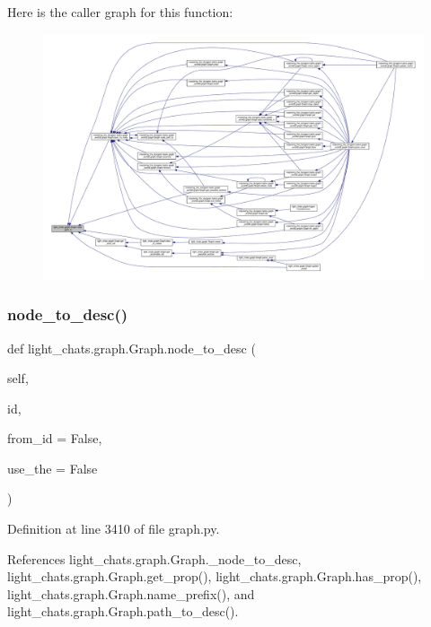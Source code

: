 Here is the caller graph for this function\+:
\nopagebreak
\begin{figure}[H]
\begin{center}
\leavevmode
\includegraphics[width=350pt]{classlight__chats_1_1graph_1_1Graph_a20da62a3d5411d93fe820accdd06fa33_icgraph}
\end{center}
\end{figure}
\mbox{\label{classlight__chats_1_1graph_1_1Graph_a9ed5168f4d2a93b6a9f3f3ddd07660d4}} 
\subsubsection{\texorpdfstring{node\+\_\+to\+\_\+desc()}{node\_to\_desc()}}
{\footnotesize\ttfamily def light\+\_\+chats.\+graph.\+Graph.\+node\+\_\+to\+\_\+desc (\begin{DoxyParamCaption}\item[{}]{self,  }\item[{}]{id,  }\item[{}]{from\+\_\+id = {\ttfamily False},  }\item[{}]{use\+\_\+the = {\ttfamily False} }\end{DoxyParamCaption})}



Definition at line 3410 of file graph.\+py.



References light\+\_\+chats.\+graph.\+Graph.\+\_\+node\+\_\+to\+\_\+desc, light\+\_\+chats.\+graph.\+Graph.\+get\+\_\+prop(), light\+\_\+chats.\+graph.\+Graph.\+has\+\_\+prop(), light\+\_\+chats.\+graph.\+Graph.\+name\+\_\+prefix(), and light\+\_\+chats.\+graph.\+Graph.\+path\+\_\+to\+\_\+desc().



